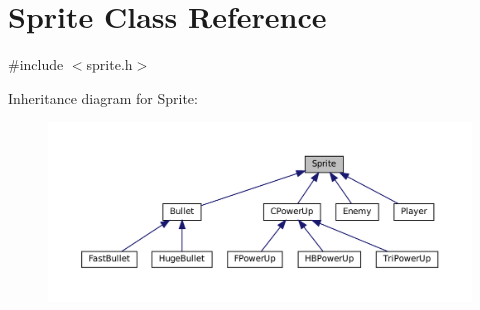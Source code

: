 \hypertarget{classSprite}{}\section{Sprite Class Reference}
\label{classSprite}


{\ttfamily \#include $<$sprite.\+h$>$}



Inheritance diagram for Sprite\+:
\nopagebreak
\begin{figure}[H]
\begin{center}
\leavevmode
\includegraphics[width=350pt]{classSprite__inherit__graph}
\end{center}
\end{figure}
